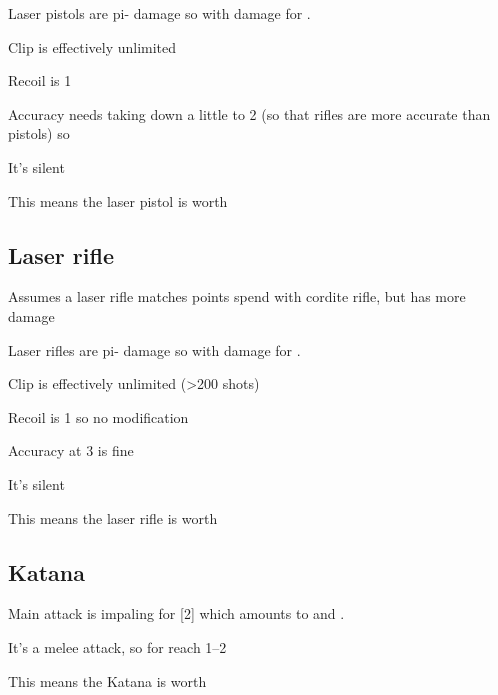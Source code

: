 \begin{innateattack}
  \item Laser pistols are pi- damage so  with
     damage for .
  \item Clip is effectively unlimited
  \item Recoil is 1
  \item Accuracy needs taking down a little to 2 (so that rifles are more
    accurate than pistols) so 
  \item It's silent
  \item This means the laser pistol is worth \InnateAttackTotalPoints{}
\end{innateattack}


\subsection{Laser rifle}
\label{sec:laser-rifle}

Assumes a laser rifle matches points spend with cordite rifle, but has more damage

\begin{innateattack}
  \item Laser rifles are pi- damage so  with
     damage for .
  \item Clip is effectively unlimited (>200 shots)
  \item Recoil is 1 so no modification
  \item Accuracy at 3 is fine
  \item It's silent
  \item This means the laser rifle is worth \InnateAttackTotalPoints{}
\end{innateattack}

\subsection{Katana}
\label{sec:katana}

\begin{innateattack}[katana]
  \item Main attack is impaling for [2] which amounts to
     and .
  \item It's a melee attack, so  for reach 1--2
  \item This means the Katana is worth \InnateAttackTotalPoints{}
\end{innateattack}
\begin{center}
  \InnateAttackBreakdown
\end{center}

